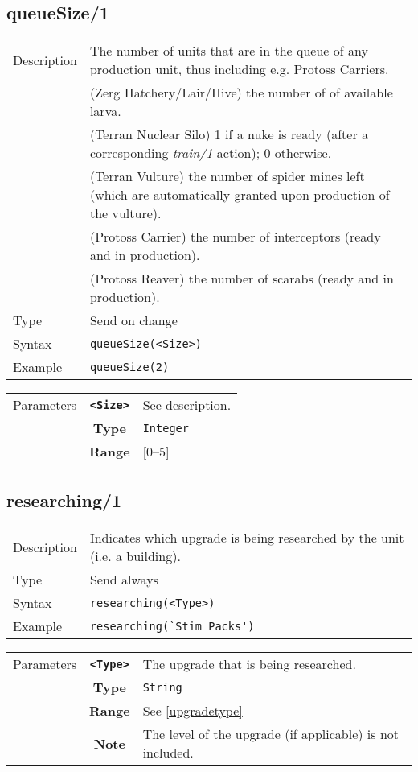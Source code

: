 \subsection{queueSize/1}
\begin{tabularx}{\textwidth}{lX}
 Description & The number of units that are in the queue of any production unit, thus including e.g. Protoss Carriers.\\
 & (Zerg Hatchery/Lair/Hive) the number of of available larva.\\
 & (Terran Nuclear Silo) 1 if a nuke is ready (after a corresponding \textit{train/1} action); 0 otherwise.\\
 & (Terran Vulture) the number of spider mines left (which are automatically granted upon production of the vulture).\\
 & (Protoss Carrier) the number of interceptors (ready and in production).\\
 & (Protoss Reaver) the number of scarabs (ready and in production).\\
 Type & Send on change \\
 Syntax & \verb|queueSize(<Size>)| \\
 Example & \verb|queueSize(2)| \\
 \end{tabularx}
 \begin{tabularx}{\textwidth}{l | c | p{8cm}|}
 \cline{2-3}
 Parameters & \textbf{\verb|<Size>|} & See description. \\
            & \textbf{Type} & \verb|Integer| \\
            & \textbf{Range} & [0--5] \\
            \cline{2-3}
\end{tabularx}

\subsection{researching/1}
\begin{tabularx}{\textwidth}{lX}
 Description & Indicates which upgrade is being researched by the unit (i.e. a building). \\
 Type & Send always \\
 Syntax & \verb|researching(<Type>)| \\
 Example & \verb|researching(`Stim Packs')| \\
 \end{tabularx}
 \begin{tabularx}{\textwidth}{l | c | p{8cm}|}
 \cline{2-3}
 Parameters & \textbf{\verb|<Type>|} & The upgrade that is being researched. \\
            & \textbf{Type} & \verb|String| \\
            & \textbf{Range} & See \ref{upgradetype} \\
 			& \textbf{Note} & The level of the upgrade (if applicable) is not included. \\
            \cline{2-3}
\end{tabularx}

